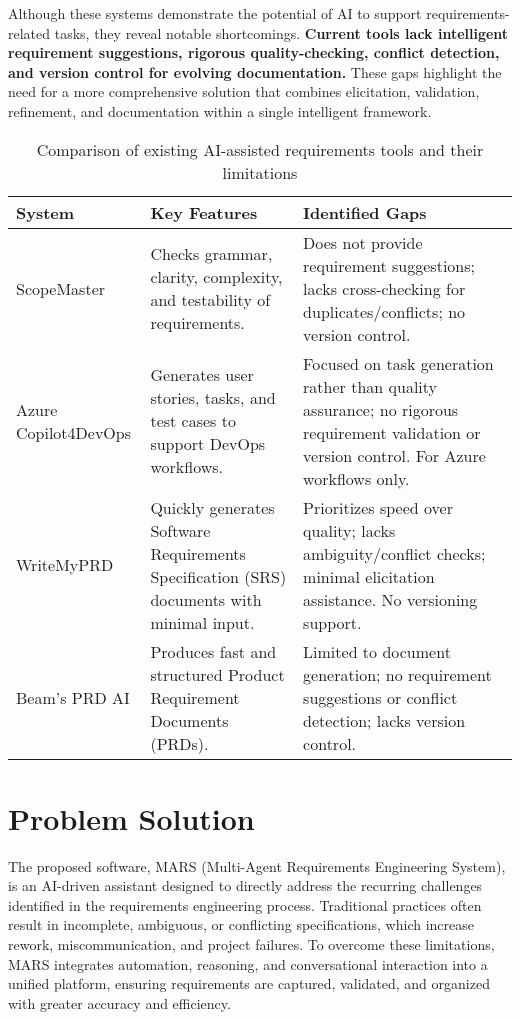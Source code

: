 Although these systems demonstrate the potential of AI to support requirements-related tasks, they reveal notable shortcomings. \textbf{Current tools lack intelligent requirement suggestions, rigorous quality-checking, conflict detection, and version control for evolving documentation.} These gaps highlight the need for a more comprehensive solution that combines elicitation, validation, refinement, and documentation within a single intelligent framework.
\begin{table}[h!]
\centering
\begin{tabular}{|p{4cm}|p{4cm}|p{4cm}|}
\hline
\textbf{System} & \textbf{Key Features} & \textbf{Identified Gaps} \\ \hline
ScopeMaster & Checks grammar, clarity, complexity, and testability of requirements. & Does not provide requirement suggestions; lacks cross-checking for duplicates/conflicts; no version control. \\ \hline
Azure Copilot4DevOps & Generates user stories, tasks, and test cases to support DevOps workflows. & Focused on task generation rather than quality assurance; no rigorous requirement validation or version control. For Azure workflows only.\\ \hline
WriteMyPRD & Quickly generates Software Requirements Specification (SRS) documents with minimal input. & Prioritizes speed over quality; lacks ambiguity/conflict checks; minimal elicitation assistance. No versioning support.\\ \hline
Beam’s PRD AI & Produces fast and structured Product Requirement Documents (PRDs). & Limited to document generation; no requirement suggestions or conflict detection; lacks version control. \\ \hline
\end{tabular}
\caption{Comparison of existing AI-assisted requirements tools and their limitations}
\label{tab:existing-solutions}
\end{table}
\section{Problem Solution}
The proposed software, MARS (Multi-Agent Requirements Engineering System), is an AI-driven assistant designed to directly address the recurring challenges identified in the requirements engineering process. Traditional practices often result in incomplete, ambiguous, or conflicting specifications, which increase rework, miscommunication, and project failures. To overcome these limitations, MARS integrates automation, reasoning, and conversational interaction into a unified platform, ensuring requirements are captured, validated, and organized with greater accuracy and efficiency.

